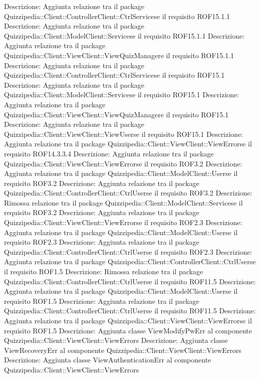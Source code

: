 Descrizione: Aggiunta relazione tra il package Quizzipedia::Client::ControllerClient::CtrlServicese il requisito ROF15.1.1 
Descrizione: Aggiunta relazione tra il package Quizzipedia::Client::ModelClient::Servicese il requisito ROF15.1.1 
Descrizione: Aggiunta relazione tra il package Quizzipedia::Client::ViewClient::ViewQuizManagere il requisito ROF15.1.1 
Descrizione: Aggiunta relazione tra il package Quizzipedia::Client::ControllerClient::CtrlServicese il requisito ROF15.1 
Descrizione: Aggiunta relazione tra il package Quizzipedia::Client::ModelClient::Servicese il requisito ROF15.1 
Descrizione: Aggiunta relazione tra il package Quizzipedia::Client::ViewClient::ViewQuizManagere il requisito ROF15.1 
Descrizione: Aggiunta relazione tra il package Quizzipedia::Client::ViewClient::ViewUserse il requisito ROF15.1 
Descrizione: Aggiunta relazione tra il package Quizzipedia::Client::ViewClient::ViewErrorse il requisito ROF14.3.3.4 
Descrizione: Aggiunta relazione tra il package Quizzipedia::Client::ViewClient::ViewErrorse il requisito ROF3.2 
Descrizione: Aggiunta relazione tra il package Quizzipedia::Client::ModelClient::Userse il requisito ROF3.2 
Descrizione: Aggiunta relazione tra il package Quizzipedia::Client::ControllerClient::CtrlUserse il requisito ROF3.2 
Descrizione: Rimossa relazione tra il package Quizzipedia::Client::ModelClient::Servicese il requisito ROF3.2 
Descrizione: Aggiunta relazione tra il package Quizzipedia::Client::ViewClient::ViewErrorse il requisito ROF2.3 
Descrizione: Aggiunta relazione tra il package Quizzipedia::Client::ModelClient::Userse il requisito ROF2.3 
Descrizione: Aggiunta relazione tra il package Quizzipedia::Client::ControllerClient::CtrlUserse il requisito ROF2.3 
Descrizione: Aggiunta relazione tra il package Quizzipedia::Client::ControllerClient::CtrlUserse il requisito ROF1.5 
Descrizione: Rimossa relazione tra il package Quizzipedia::Client::ControllerClient::CtrlUserse il requisito ROF11.5 
Descrizione: Aggiunta relazione tra il package Quizzipedia::Client::ModelClient::Userse il requisito ROF1.5 
Descrizione: Aggiunta relazione tra il package Quizzipedia::Client::ControllerClient::CtrlUserse il requisito ROF11.5 
Descrizione: Aggiunta relazione tra il package Quizzipedia::Client::ViewClient::ViewErrorse il requisito ROF1.5 
Descrizione: Aggiunta classe ViewModifyPwErr al componente Quizzipedia::Client::ViewClient::ViewErrors 
Descrizione: Aggiunta classe ViewRecoveryErr al componente Quizzipedia::Client::ViewClient::ViewErrors 
Descrizione: Aggiunta classe ViewAuthenticationErr al componente Quizzipedia::Client::ViewClient::ViewErrors 
